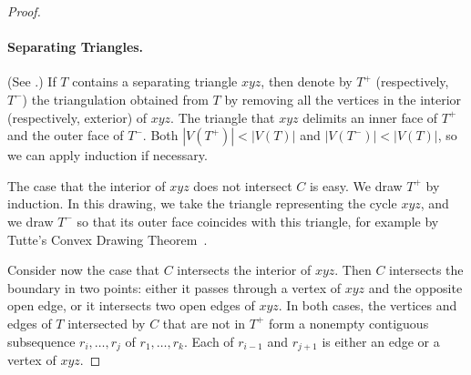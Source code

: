 \begin{proof}
	
	
\paragraph{Separating Triangles.}
(See .)
	If $T$ contains a separating triangle $xyz$, then denote by
        $T^+$ (respectively, $T^-$) the triangulation obtained from
        $T$ by removing all the vertices in the interior
        (respectively, exterior) of $xyz$. The triangle that $xyz$ delimits an
        inner face of $T^+$ and the outer face of $T^-$.
Both $|V(T^+)|<|V(T)|$
and $|V(T^-)|<|V(T)|$, so we can apply induction if necessary.
        
The case that the interior of $xyz$ does not intersect $C$ is easy.
We draw $T^+$ by induction.  In this drawing, %
we take the triangle representing the cycle $xyz$, and we draw $T^-$
so that its outer face coincides with this triangle, for example by
Tutte's Convex Drawing Theorem~\cite{tutte:how}.

Consider now the case that $C$ intersects the interior of $xyz$. Then
$C$ intersects the boundary in two points: either it passes through a
vertex of $xyz$ and the opposite open edge, or it intersects two open
edges of $xyz$. %
In both cases, the vertices and edges of $T$ intersected by $C$ that
are not in $T^+$ form a nonempty contiguous subsequence
$r_i,\ldots,r_j$ of $r_1,\ldots,r_k$. Each of $r_{i-1}$ and $r_{j+1}$
is either an edge or a vertex of $xyz$.
	

\end{proof}
